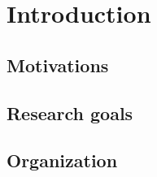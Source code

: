 \chapter{Introduction}

\blindtext

\section{Motivations}
\blindtext


\section{Research goals}
\blindtext


\section{Organization}
\blindtext
